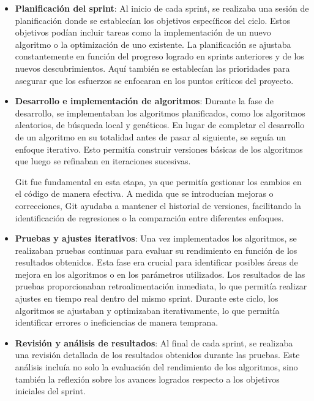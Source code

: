 \begin{itemize}
    \item \textbf{Planificación del sprint}: Al inicio de cada sprint, se realizaba una sesión de planificación donde
    se establecían los objetivos específicos del ciclo.
    Estos objetivos podían incluir tareas como la implementación de un nuevo algoritmo o la optimización de uno
    existente.
    La planificación se ajustaba constantemente en función del progreso logrado en sprints anteriores y de los nuevos
    descubrimientos.
    Aquí también se establecían las prioridades para asegurar que los esfuerzos se enfocaran en los puntos críticos del
    proyecto.
    \item \textbf{Desarrollo e implementación de algoritmos}: Durante la fase de desarrollo, se implementaban los
    algoritmos planificados, como los algoritmos aleatorios, de búsqueda local y genéticos.
    En lugar de completar el desarrollo de un algoritmo en su totalidad antes de pasar al siguiente, se seguía un
    enfoque iterativo.
    Esto permitía construir versiones básicas de los algoritmos que luego se refinaban en iteraciones sucesivas.


    Git fue fundamental en esta etapa, ya que permitía gestionar los cambios en el código de manera efectiva.
    A medida que se introducían mejoras o correcciones, Git ayudaba a mantener el historial de versiones, facilitando
    la identificación de regresiones o la comparación entre diferentes enfoques.
    \item \textbf{Pruebas y ajustes iterativos}: Una vez implementados los algoritmos, se realizaban pruebas continuas
    para evaluar su rendimiento en función de los resultados obtenidos.
    Esta fase era crucial para identificar posibles áreas de mejora en los algoritmos o en los parámetros utilizados.
    Los resultados de las pruebas proporcionaban retroalimentación inmediata, lo que permitía realizar ajustes en
    tiempo real dentro del mismo sprint.
    Durante este ciclo, los algoritmos se ajustaban y optimizaban iterativamente, lo que permitía identificar errores o
    ineficiencias de manera temprana.
    \item \textbf{Revisión y análisis de resultados}: Al final de cada sprint, se realizaba una revisión detallada de
    los resultados obtenidos durante las pruebas.
    Este análisis incluía no solo la evaluación del rendimiento de los algoritmos, sino también la reflexión sobre los
    avances logrados respecto a los objetivos iniciales del sprint.



\end{itemize}
